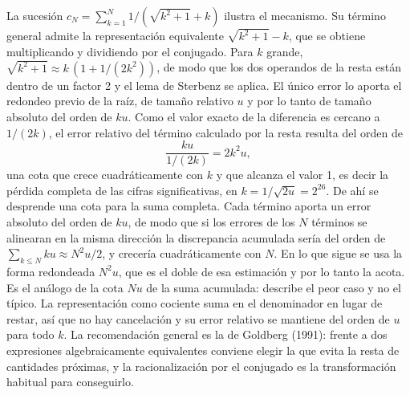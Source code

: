 La sucesión $c_N = \sum_{k=1}^{N} 1/(\sqrt{k^{2}+1} + k)$ ilustra el mecanismo. Su término general
admite la representación equivalente $\sqrt{k^{2}+1} - k$, que se obtiene multiplicando y dividiendo
por el conjugado. Para $k$ grande, $\sqrt{k^{2}+1} \approx k\,(1 + 1/(2k^{2}))$, de modo que los dos
operandos de la resta están dentro de un factor 2 y el lema de Sterbenz se aplica. El único error lo
aporta el redondeo previo de la raíz, de tamaño relativo $u$ y por lo tanto de tamaño absoluto del
orden de $k u$. Como el valor exacto de la diferencia es cercano a $1/(2k)$, el error relativo del
término calculado por la resta resulta del orden de
\begin{equation}
  \frac{k u}{1/(2k)} = 2k^{2} u ,
  \label{eq:cota-termino}
\end{equation}
una cota que crece cuadráticamente con $k$ y que alcanza el valor 1, es decir la pérdida completa de
las cifras significativas, en $k = 1/\sqrt{2u} = 2^{26}$. De ahí se desprende una cota para la suma
completa. Cada término aporta un error absoluto del orden de $k u$, de modo que si los errores de
los $N$ términos se alinearan en la misma dirección la discrepancia acumulada sería del orden de
$\sum_{k \le N} k u \approx N^{2} u / 2$, y crecería cuadráticamente con $N$. En lo que sigue se
usa la forma redondeada $N^{2}u$, que es el doble de esa estimación y por lo tanto la acota. Es el
análogo de la cota $Nu$ de la suma acumulada: describe el peor caso y no el típico. La representación como cociente suma en el
denominador en lugar de restar, así que no hay cancelación y su error relativo se mantiene del orden
de $u$ para todo $k$. La recomendación general es la de Goldberg (1991): frente a dos expresiones
algebraicamente equivalentes conviene elegir la que evita la resta de cantidades próximas, y la
racionalización por el conjugado es la transformación habitual para conseguirlo.

